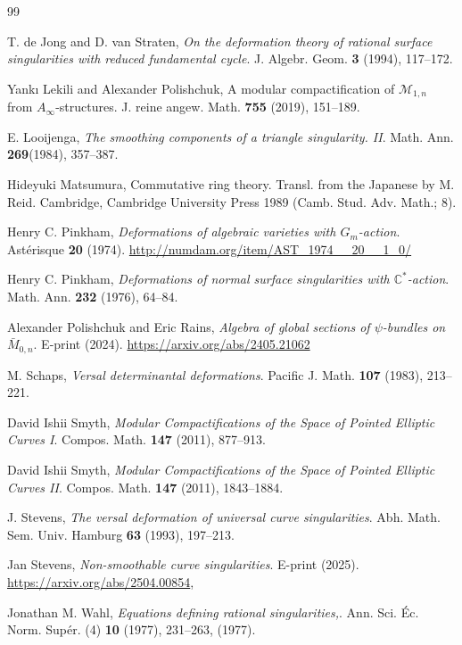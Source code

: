 \documentclass[12pt,a4paper]{amsart}  %
\theoremstyle{definition}
\theoremstyle{remark}
\begin{document}
\begin{thebibliography}{99}
  
  T. de Jong and D. van Straten,
   {\sl On the deformation theory of rational surface singularities with reduced fundamental cycle\/}.
   J. Algebr. Geom. {\bf3} (1994), 117--172.
   
   

Yankı Lekili  and Alexander Polishchuk,
A modular compactification of \(\mathcal{M}_{1,n}\) from \(A_ \infty\)-structures.
J. reine angew. Math. {\bf755} (2019), 151--189.\\

E. Looijenga, 
{\sl The smoothing components of a triangle singularity. II\/}.
Math. Ann.  {\bf269}(1984), 357--387.

Hideyuki Matsumura, 
Commutative ring theory. Transl. from the Japanese by M. Reid. 
Cambridge,  Cambridge University Press 1989 
(Camb. Stud. Adv. Math.; 8).

  Henry C. Pinkham,
  {\sl Deformations of algebraic varieties with
  $G_{m}$-action\/}.
  Ast\'erisque {\bf 20} (1974).
\url{http://numdam.org/item/AST_1974__20__1_0/}

  Henry C. Pinkham,
  {\sl Deformations of normal surface singularities with
  $\mathbb C^*$-action\/}.
  Math. Ann. {\bf 232} (1976), 64--84.


Alexander Polishchuk and Eric Rains,
      {\sl Algebra of global sections of $\psi$-bundles on $\bar{M}_{0,n}$\/}.
      E-print (2024).
\url{https://arxiv.org/abs/2405.21062}


M. Schaps,
{\sl Versal determinantal deformations\/}.
Pacific J. Math. {\bf 107} (1983), 213--221. 

David Ishii Smyth, 
{\sl Modular Compactifications of the Space of Pointed Elliptic Curves I\/}.
Compos. Math. {\bf147} (2011), 877--913. \\

David Ishii Smyth, 
{\sl Modular Compactifications of the Space of Pointed Elliptic Curves II\/}.
Compos. Math. {\bf147} (2011), 1843--1884. \\

  J. Stevens, 
  {\sl The versal deformation of universal curve
  singularities\/}.
  Abh. Math. Sem. Univ. Hamburg {\bf 63} (1993), 197--213.

Jan Stevens,
 {\sl Non-smoothable curve singularities\/}.
      E-print (2025).
      \url{https://arxiv.org/abs/2504.00854}, 

Jonathan M. Wahl, 
{\sl Equations defining rational singularities,\/}.
Ann. Sci. Éc. Norm. Supér. (4) {\bf10} (1977), 231--263, (1977).

\end{thebibliography}
\end{document}
